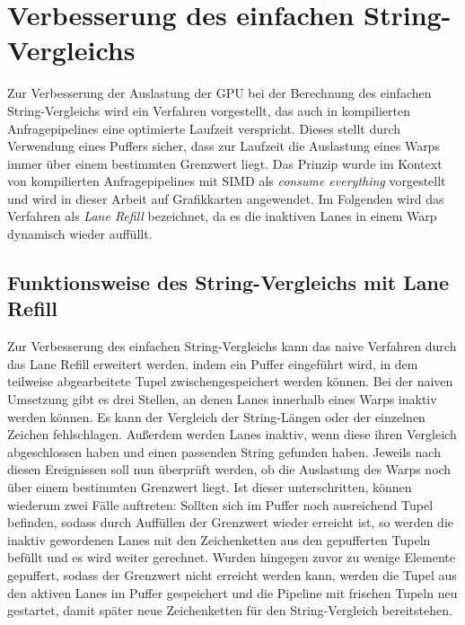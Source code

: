 \chapter{Verbesserung des einfachen String-Vergleichs}
\label{sec:equals_lane_refill}

Zur Verbesserung der Auslastung der GPU bei der Berechnung des einfachen String-Vergleichs wird ein Verfahren vorgestellt, das auch in kompilierten Anfragepipelines eine optimierte Laufzeit verspricht.
Dieses stellt durch Verwendung eines Puffers sicher, dass zur Laufzeit die Auslastung eines Warps immer über einem bestimmten Grenzwert liegt.
Das Prinzip wurde im Kontext von kompilierten Anfragepipelines mit SIMD als \emph{consume everything} vorgestellt \cite{Lang2018} und wird in dieser Arbeit auf Grafikkarten angewendet.
Im Folgenden wird das Verfahren als \emph{Lane Refill} bezeichnet, da es die inaktiven Lanes in einem Warp dynamisch wieder auffüllt.

\section{Funktionsweise des String-Vergleichs mit Lane Refill}
\label{sec:equals_lane_refill_funktionsweise}

Zur Verbesserung des einfachen String-Vergleichs kann das naive Verfahren durch das Lane Refill erweitert werden, indem ein Puffer eingeführt wird, in dem teilweise abgearbeitete Tupel zwischengespeichert werden können.
Bei der naiven Umsetzung gibt es drei Stellen, an denen Lanes innerhalb eines Warps inaktiv werden können.
Es kann der Vergleich der String-Längen oder der einzelnen Zeichen fehlschlagen. 
Außerdem werden Lanes inaktiv, wenn diese ihren Vergleich abgeschlossen haben und einen passenden String gefunden haben.
Jeweils nach diesen Ereignissen soll nun überprüft werden, ob die Auslastung des Warps noch über einem bestimmten Grenzwert liegt.
Ist dieser unterschritten, können wiederum zwei Fälle auftreten:
Sollten sich im Puffer noch ausreichend Tupel befinden, sodass durch Auffüllen der Grenzwert wieder erreicht ist, so werden die inaktiv gewordenen Lanes mit den Zeichenketten aus den gepufferten Tupeln befüllt und es wird weiter gerechnet.
Wurden hingegen zuvor zu wenige Elemente gepuffert, sodass der Grenzwert nicht erreicht werden kann, werden die Tupel aus den aktiven Lanes im Puffer gespeichert und die Pipeline mit frischen Tupeln neu gestartet, damit später neue Zeichenketten für den String-Vergleich bereitstehen.

